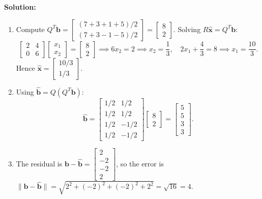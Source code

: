 \documentclass[11pt, letterpaper]{article}
\theoremstyle{definition}
\theoremstyle{remark}
\begin{document}
\textbf{Solution:}
\begin{enumerate}[label=(\alph*)]
    \item Compute $Q^T \mathbf{b} = \begin{bmatrix} (7+3+1+5)/2 \\ (7+3-1-5)/2 \end{bmatrix} = \begin{bmatrix} 8 \\ 2 \end{bmatrix}$. Solving $R\hat{\mathbf{x}} = Q^T \mathbf{b}$:
    \[
    \begin{bmatrix} 2 & 4 \\ 0 & 6 \end{bmatrix} \begin{bmatrix} x_1 \\ x_2 \end{bmatrix} = \begin{bmatrix} 8 \\ 2 \end{bmatrix} \implies 6x_2 = 2 \implies x_2 = \frac{1}{3}, \quad 2x_1 + \frac{4}{3} = 8 \implies x_1 = \frac{10}{3}.
    \]
    Hence $\hat{\mathbf{x}} = \begin{bmatrix} 10/3 \\ 1/3 \end{bmatrix}$.
    \item Using $\hat{\mathbf{b}} = Q(Q^T \mathbf{b})$:
    \[
    \hat{\mathbf{b}} = \begin{bmatrix} 1/2 & 1/2 \\ 1/2 & 1/2 \\ 1/2 & -1/2 \\ 1/2 & -1/2 \end{bmatrix} \begin{bmatrix} 8 \\ 2 \end{bmatrix} = \begin{bmatrix} 5 \\ 5 \\ 3 \\ 3 \end{bmatrix}.
    \]
    \item The residual is $\mathbf{b} - \hat{\mathbf{b}} = \begin{bmatrix} 2 \\ -2 \\ -2 \\ 2 \end{bmatrix}$, so the error is $\|\mathbf{b} - \hat{\mathbf{b}}\| = \sqrt{2^2 + (-2)^2 + (-2)^2 + 2^2} = \sqrt{16} = 4$.
\end{enumerate}
\end{document}
